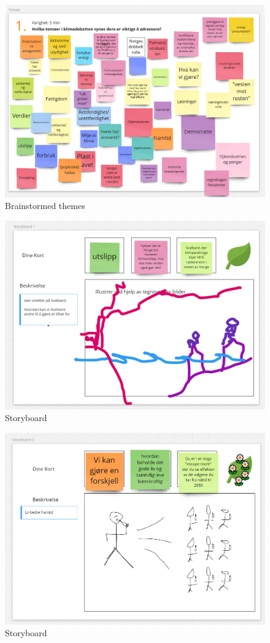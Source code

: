 \begin{figure}[H]
     \centering 
    \includegraphics[width=12.5cm]{pictures/appendix/narrative/tema.PNG}
    \caption{Brainstormed themes}
\end{figure}

\begin{figure}[H]
     \centering 
    \includegraphics[width=12.5cm]{pictures/appendix/narrative/s1.PNG}
    \caption{Storyboard}
\end{figure}

\begin{figure}[H]
    \centering 
    \includegraphics[width=12.5cm]{pictures/appendix/narrative/s2.PNG}
    \caption{Storyboard}
\end{figure}

